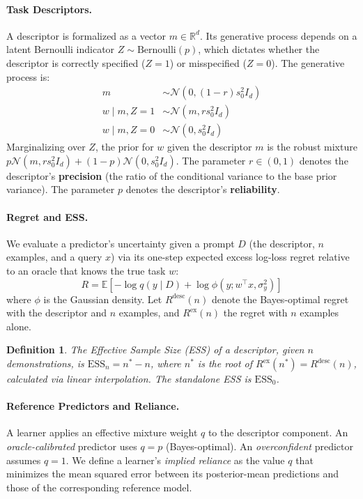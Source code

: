 \documentclass{article}
\newtheorem{definition}{Definition}
\begin{document}
\paragraph{Task Descriptors.} A descriptor is formalized as a vector $m \in \mathbb{R}^d$. Its generative process depends on a latent Bernoulli indicator $Z \sim \text{Bernoulli}(p)$, which dictates whether the descriptor is correctly specified ($Z=1$) or misspecified ($Z=0$). The generative process is:
\begin{align}
    m &\sim \mathcal{N}(0, (1-r)s_0^2 I_d) \\
    w \mid m, Z=1 &\sim \mathcal{N}(m, r s_0^2 I_d) \\
    w \mid m, Z=0 &\sim \mathcal{N}(0, s_0^2 I_d)
\end{align}
Marginalizing over $Z$, the prior for $w$ given the descriptor $m$ is the robust mixture $p \mathcal{N}(m, rs_0^2 I_d) + (1-p) \mathcal{N}(0, s_0^2 I_d)$. The parameter $r \in (0, 1)$ denotes the descriptor's \textbf{precision} (the ratio of the conditional variance to the base prior variance). The parameter $p$ denotes the descriptor's \textbf{reliability}.

\paragraph{Regret and ESS.} We evaluate a predictor's uncertainty given a prompt $D$ (the descriptor, $n$ examples, and a query $x$) via its one-step expected excess log-loss regret relative to an oracle that knows the true task $w$:
\begin{equation}
    R = \mathbb{E} \left[ -\log q(y \mid D) + \log \phi(y; w^\top x, \sigma_y^2) \right]
\end{equation}
where $\phi$ is the Gaussian density. Let $R^{\text{desc}}(n)$ denote the Bayes-optimal regret with the descriptor and $n$ examples, and $R^{\text{ex}}(n)$ the regret with $n$ examples alone. 
\begin{definition}
The Effective Sample Size (ESS) of a descriptor, given $n$ demonstrations, is $\text{ESS}_n = n^* - n$, where $n^*$ is the root of $R^{\text{ex}}(n^*) = R^{\text{desc}}(n)$, calculated via linear interpolation. The standalone ESS is $\text{ESS}_0$.
\end{definition}

\paragraph{Reference Predictors and Reliance.} A learner applies an effective mixture weight $q$ to the descriptor component. An \emph{oracle-calibrated} predictor uses $q=p$ (Bayes-optimal). An \emph{overconfident} predictor assumes $q=1$. We define a learner's \emph{implied reliance} as the value $q$ that minimizes the mean squared error between its posterior-mean predictions and those of the corresponding reference model.
\end{document}
